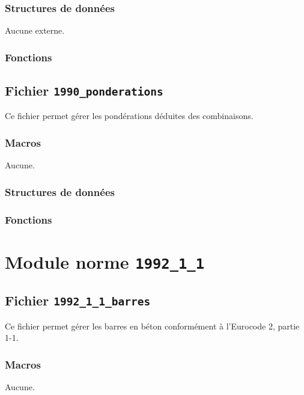 \documentclass{article}
\begin{document}
\subsubsection{Structures de données}
Aucune externe.
\subsubsection{Fonctions}


\subsection{Fichier {\texttt{1990\_ponderations}}}
Ce fichier permet gérer les pondérations déduites des combinaisons.
\subsubsection{Macros}
Aucune.
\subsubsection{Structures de données}


\subsubsection{Fonctions}










\section{Module norme {\texttt{1992\_1\_1}}}
\subsection{Fichier {\texttt{1992\_1\_1\_barres}}}
Ce fichier permet gérer les barres en béton conformément à l'Eurocode 2, partie 1-1.\par
\subsubsection{Macros}
Aucune.
\end{document}
